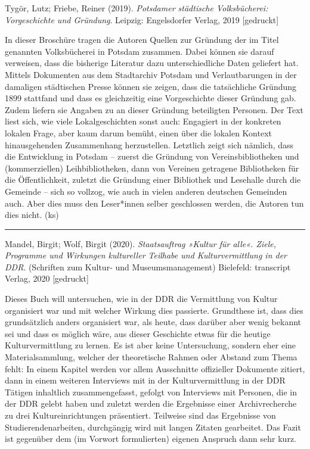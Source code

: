 \documentclass[a4paper,
fontsize=11pt,
oneside,
numbers=noperiodatend,
parskip=half-,
bibliography=totoc,
final
]{scrartcl}
\begin{document}
Tygör, Lutz; Friebe, Reiner (2019). \emph{Potsdamer städtische
Volksbücherei: Vorgeschichte und Gründung}. Leipzig: Engelsdorfer
Verlag, 2019 {[}gedruckt{]}

In dieser Broschüre tragen die Autoren Quellen zur Gründung der im Titel
genannten Volksbücherei in Potsdam zusammen. Dabei können sie darauf
verweisen, dass die bisherige Literatur dazu unterschiedliche Daten
geliefert hat. Mittels Dokumenten aus dem Stadtarchiv Potsdam und
Verlautbarungen in der damaligen städtischen Presse können sie zeigen,
dass die tatsächliche Gründung 1899 stattfand und dass es gleichzeitig
eine Vorgeschichte dieser Gründung gab. Zudem liefern sie Angaben zu an
dieser Gründung beteiligten Personen. Der Text liest sich, wie viele
Lokalgeschichten sonst auch: Engagiert in der konkreten lokalen Frage,
aber kaum darum bemüht, einen über die lokalen Kontext hinausgehenden
Zusammenhang herzustellen. Letztlich zeigt sich nämlich, dass die
Entwicklung in Potsdam -- zuerst die Gründung von Vereinsbibliotheken
und (kommerziellen) Leihbibliotheken, dann von Vereinen getragene
Bibliotheken für die Öffentlichkeit, zuletzt die Gründung einer
Bibliothek und Lesehalle durch die Gemeinde -- sich so vollzog, wie auch
in vielen anderen deutschen Gemeinden auch. Aber dies muss den
Leser*innen selber geschlossen werden, die Autoren tun dies nicht. (ks)

\begin{center}\rule{0.5\linewidth}{0.5pt}\end{center}

Mandel, Birgit; Wolf, Birgit (2020). \emph{Staatsauftrag »Kultur für
alle«. Ziele, Programme und Wirkungen kultureller Teilhabe und
Kulturvermittlung in der DDR}. (Schriften zum Kultur- und
Museumsmanagement) Bielefeld: transcript Verlag, 2020 {[}gedruckt{]}

Dieses Buch will untersuchen, wie in der DDR die Vermittlung von Kultur
organisiert war und mit welcher Wirkung dies passierte. Grundthese ist,
dass dies grundsätzlich anders organisiert war, als heute, dass darüber
aber wenig bekannt sei und dass es möglich wäre, aus dieser Geschichte
etwas für die heutige Kulturvermittlung zu lernen. Es ist aber keine
Untersuchung, sondern eher eine Materialsammlung, welcher der
theoretische Rahmen oder Abstand zum Thema fehlt: In einem Kapitel
werden vor allem Ausschnitte offizieller Dokumente zitiert, dann in
einem weiteren Interviews mit in der Kulturvermittlung in der DDR
Tätigen inhaltlich zusammengefasst, gefolgt von Interviews mit Personen,
die in der DDR gelebt haben und zuletzt werden die Ergebnisse einer
Archivrecherche zu drei Kultureinrichtungen präsentiert. Teilweise sind
das Ergebnisse von Studierendenarbeiten, durchgängig wird mit langen
Zitaten gearbeitet. Das Fazit ist gegenüber dem (im Vorwort
formulierten) eigenen Anspruch dann sehr kurz.
\end{document}
